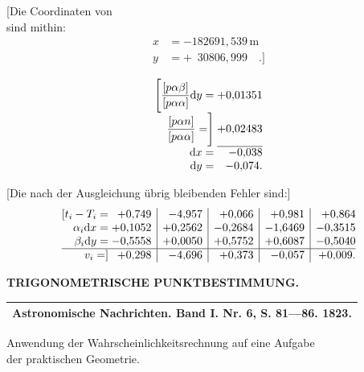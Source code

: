 \noindent
\begin{minipage}[t]{.55\linewidth}
 [Die Coordinaten von \\
 sind mithin:
 \[
 \begin{aligned}
  x&=-182691{,}539\,\mathrm{m}\\
  y&=+\phantom{1}30806{,}999\quad .]
 \end{aligned}
 \]
\end{minipage}\hfill
\begin{minipage}[t]{.43\linewidth}
 \[
 \begin{array}{@{}r@{\;}r@{}}
  \Biggl[\dfrac{[p\alpha\beta]}{[p\alpha\alpha]}\mathrm{d}y=&+0{,}01351\\[5pt]
  \dfrac{[p\alpha n]}{[p\alpha\alpha]}=\Biggr]&+0{,}02483\\
  \cline{2-2}
  \mathrm{d}x=&-0{,}038\\
  \mathrm{d}y=&-0{,}074.
 \end{array}
 \]
\end{minipage}\par

[Die nach der Ausgleichung übrig bleibenden Fehler sind:]
\[
\begin{array}{@{}r@{\;}r|r|r|r|r@{}}
 [t_i-T_i=&+0{,}749&-4{,}957&+0{,}066&+0{,}981&+0{,}864\\
 \alpha_i\mathrm{d}x=&+0{,}1052&+0{,}2562&-0{,}2684&-1{,}6469&-0{,}3515\\
 \beta_i\mathrm{d}y=&-0{,}5558&+0{,}0050&+0{,}5752&+0{,}6087&-0{,}5040\\
 \hline
 v_i=]&+0{,}298&-4{,}696&+0{,}373&-0{,}057&+0{,}009.
\end{array}
\]

\par\clearpage
\noindent\null\hfill{\small\textbf{TRIGONOMETRISCHE PUNKTBESTIMMUNG.}}\hfill{}\par\medskip

\vspace*{3.6\baselineskip}
{\centering
[6.]\par\medskip
{\footnotesize
\begin{tabular}{c}
\hline
Astronomische Nachrichten. Band I. Nr. 6, S. 81—86. 1823.\\
\hline
\end{tabular}\par}
\medskip
Anwendung der Wahrscheinlichkeitsrechnung auf eine Aufgabe\\
der praktischen Geometrie.\par}
\medskip

